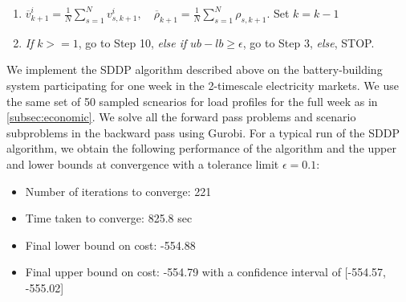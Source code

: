 \documentclass[11pt,twoside]{article}
\begin{document}
{\begin{enumerate}
\begin{enumerate}
\item Add a cut to the optimization problems $\mathcal{P}^f_{k}$ and $\mathcal{P}^b_{k}$: $\theta_{k+1} \geq \overline{v}^i_{k+1} - \overline{\rho}_{k+1}E_{n_\text{rtm}, k}$
\item Solve the problem $\mathcal{P}^b_{k}$. Get the optimal objective value $Q^{i+1}_{s,k+1}(E_{0, k})$ and the duals corresponding to each of the ${n_\text{rtm}}$ constraints linking the state variables at each subinterval. Denote the sum of these duals by $\rho_{s,k+1}$ and calculate $v^i_{s,k+1} = Q^{i+1}_{s,k+1}(E_{0, k}) - \rho_{s,k+1} E_{n_\text{rtm},k-1}$
\end{enumerate}
\emph{end for}
\item $\overline{v}^i_{k+1} = \frac{1}{N}\sum\limits_{s=1}^{N}{v^i_{s,k+1}}, \quad \overline{\rho}_{k+1} = \frac{1}{N}\sum\limits_{s=1}^{N}{\rho_{s,k+1}}$. Set $k=k-1$
\item \emph{If} $k >= 1$, go to Step 10, \emph{else if} $ub - lb \geq \epsilon$, go to Step 3, \emph{else}, STOP.
\end{enumerate}}

We implement the SDDP algorithm described above on the battery-building system participating for one week in the 2-timescale electricity markets. We use the same set of 50 sampled scnearios for load profiles for the full week as in \ref{subsec:economic}. We solve all the forward pass problems and scenario subproblems in the backward pass using Gurobi. For a typical run of the SDDP algorithm, we obtain the following performance of the algorithm and the upper and lower bounds at convergence with a tolerance limit $\epsilon = 0.1$:
\begin{itemize}
\item Number of iterations to converge: 221
\item Time taken to converge: 825.8 sec
\item Final lower bound on cost: -554.88
\item Final upper bound on cost: -554.79 with a confidence interval of [-554.57, -555.02]
\end{itemize}
\end{document}
